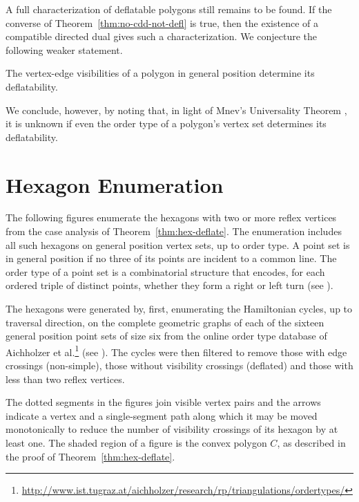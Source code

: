 \documentclass[11pt]{amsart}
\begin{document}
A full characterization of deflatable polygons still remains to be
found.  If the converse of Theorem~\ref{thm:no-cdd-not-defl} is true,
then the existence of a compatible directed dual gives such a
characterization.  We conjecture the following weaker statement.

\begin{conj}
  The vertex-edge visibilities of a polygon in general position
  determine its deflatability.
\end{conj}

We conclude, however, by noting that, in light of Mnev's Universality
Theorem \cite{Mnev88}, it is unknown if even the order type of a
polygon's vertex set determines its deflatability.

%



{}



\appendix
\section{Hexagon Enumeration}
\label{apx:hexagons}
The following figures enumerate the hexagons with two or more reflex
vertices from the case analysis of Theorem~\ref{thm:hex-deflate}.  The
enumeration includes all such hexagons on general position vertex
sets, up to order type.  A point set is in general position if no
three of its points are incident to a common line.  The order type of
a point set is a combinatorial structure that encodes, for each
ordered triple of distinct points, whether they form a right or left
turn (see \cite{Goodman83}).

The hexagons were generated by, first, enumerating the Hamiltonian
cycles, up to traversal direction, on the complete geometric graphs of
each of the sixteen general position point sets of size six from the
online order type database of Aichholzer et
al.\footnote{\url{http://www.ist.tugraz.at/aichholzer/research/rp/triangulations/ordertypes/}}
(see \cite{Aichholzer02}).  The cycles were then filtered to remove
those with edge crossings (non-simple), those without visibility
crossings (deflated) and those with less than two reflex vertices.

The dotted segments in the figures join visible vertex pairs and the
arrows indicate a vertex and a single-segment path along which it may
be moved monotonically to reduce the number of visibility crossings of
its hexagon by at least one.  The shaded region of a figure is the
convex polygon $C$, as described in the proof of
Theorem~\ref{thm:hex-deflate}.


\end{document}
